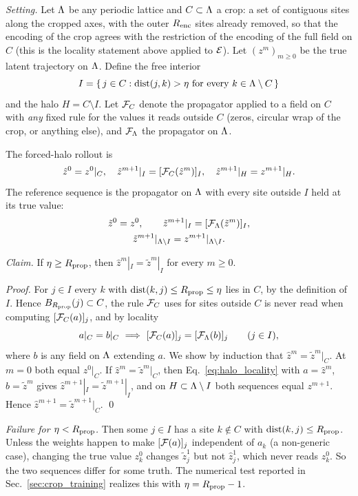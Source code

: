 \emph{Setting.} Let $\Lambda$ be any periodic lattice and $C\subset\Lambda$ a
crop: a set of contiguous sites along the cropped axes, with the outer
$R_{\mathrm{enc}}$ sites already removed, so that the encoding of the crop agrees
with the restriction of the encoding of the full field on $C$ (this is
the locality statement above applied to $\mathcal{E}$). Let $(z^m)_{m\ge0}$ be the
true latent trajectory on $\Lambda$. Define the free interior
\[
  I = \{\, j\in C : \dist(j,k) > \eta \ \text{for every } k\in\Lat\setminus C \,\}
\]
and the halo $H=C\setminus I$. Let $\mathcal{F}_C$ denote the propagator applied
to a field on $C$ with \emph{any} fixed rule for the values it reads
outside $C$ (zeros, circular wrap of the crop, or anything else), and
$\mathcal{F}_\Lambda$ the propagator on $\Lambda$.

The forced-halo rollout is
\[
  \hat z^0 = z^0|_C, \quad
  \hat z^{m+1}|_I = [\mathcal{F}_C(\hat z^m)]_I, \quad
  \hat z^{m+1}|_H = z^{m+1}|_H .
\]
The reference sequence is the propagator on $\Lambda$ with every site
outside $I$ held at its true value:
\[
\begin{gathered}
  \tilde z^0 = z^0, \qquad
  \tilde z^{m+1}|_I = [\mathcal{F}_\Lambda(\tilde z^m)]_I,\\
  \tilde z^{m+1}|_{\Lambda\setminus I} = z^{m+1}|_{\Lambda\setminus I}.
\end{gathered}
\]

\emph{Claim.} If $\eta\ge R_{\mathrm{prop}}$, then $\hat z^m|_I = \tilde z^m|_I$ for
every $m\ge0$.

\emph{Proof.} For $j\in I$ every $k$ with $\operatorname{dist}(k,j)\le R_{\mathrm{prop}}\le\eta$
lies in $C$, by the definition of $I$. Hence $B_{R_{\mathrm{prop}}}(j)\subset C$,
the rule $\mathcal{F}_C$ uses for sites outside $C$ is never read when computing
$[\mathcal{F}_C(a)]_j$, and by locality
\begin{equation}
  a|_C = b|_C \ \Longrightarrow\ [\mathcal{F}_C(a)]_j = [\mathcal{F}_\Lambda(b)]_j
  \qquad (j\in I),
  \label{eq:halo_locality}
\end{equation}
where $b$ is any field on $\Lambda$ extending $a$. We show by induction that
$\hat z^m = \tilde z^m|_C$. At $m=0$ both equal $z^0|_C$. If
$\hat z^m=\tilde z^m|_C$, then Eq.~\eqref{eq:halo_locality} with
$a=\hat z^m$, $b=\tilde z^m$ gives $\hat z^{m+1}|_I=\tilde z^{m+1}|_I$,
and on $H\subset\Lambda\setminus I$ both sequences equal $z^{m+1}$. Hence
$\hat z^{m+1}=\tilde z^{m+1}|_C$. \qed

\emph{Failure for $\eta<R_{\mathrm{prop}}$.} Then some $j\in I$ has a site
$k\notin C$ with $\operatorname{dist}(k,j)\le R_{\mathrm{prop}}$. Unless the weights happen to make
$[\mathcal{F}(a)]_j$ independent of $a_k$ (a non-generic case), changing the
true value $z^0_k$ changes $\tilde z^1_j$ but not $\hat z^1_j$, which
never reads $z^0_k$. So the two sequences differ for some truth. The
numerical test reported in Sec.~\ref{sec:crop_training} realizes this
with $\eta=R_{\mathrm{prop}}-1$.

